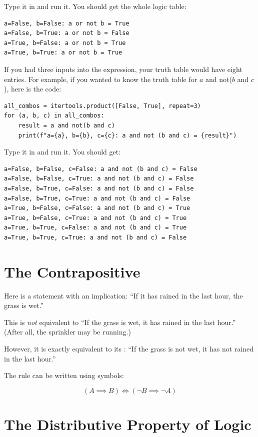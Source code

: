 Type it in and run it. You should get the whole logic table:

\begin{verbatim}
a=False, b=False: a or not b = True
a=False, b=True: a or not b = False
a=True, b=False: a or not b = True
a=True, b=True: a or not b = True
\end{verbatim}

If you had three inputs into the expression, your truth table would
have eight entries.  For example, if you wanted to know the truth
table for $a$ and not($b$ and $c$), here is the code:

\begin{verbatim}
all_combos = itertools.product([False, True], repeat=3)
for (a, b, c) in all_combos:
    result = a and not(b and c)
    print(f"a={a}, b={b}, c={c}: a and not (b and c) = {result}")
\end{verbatim}

Type it in and run it. You should get:

\begin{verbatim}
a=False, b=False, c=False: a and not (b and c) = False
a=False, b=False, c=True: a and not (b and c) = False
a=False, b=True, c=False: a and not (b and c) = False
a=False, b=True, c=True: a and not (b and c) = False
a=True, b=False, c=False: a and not (b and c) = True
a=True, b=False, c=True: a and not (b and c) = True
a=True, b=True, c=False: a and not (b and c) = True
a=True, b=True, c=True: a and not (b and c) = False
\end{verbatim}

\section{The Contrapositive}

Here is a statement with an implication: ``If it has rained in the last hour, the grass is wet.''

This is \textit{not} equivalent to ``If the grass is wet, it has
rained in the last hour.'' (After all, the sprinkler may be running.)

However, it is exactly equivalent to its :
``If the grass is not wet, it has not rained in the last hour.'' 

The rule can be written using symbols:

$$\left( A \implies B \right) \iff \left( \neg B \implies \neg A \right)$$

\section{The Distributive Property of Logic}

